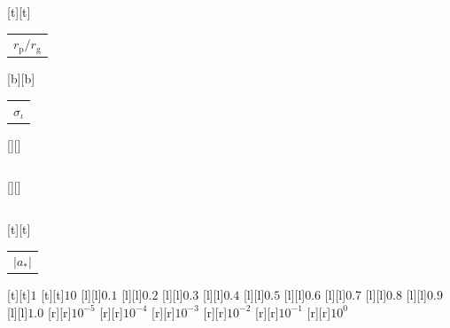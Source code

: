 %    
%
%
\begin{psfrags}%
\psfragscanon%
%
[t][t]{\color[rgb]{0,0,0}\setlength{\tabcolsep}{0pt}\begin{tabular}{c}{\Large$r_\mathrm{p}/r_\mathrm{g}$}\end{tabular}}%
[b][b]{\color[rgb]{0,0,0}\setlength{\tabcolsep}{0pt}\begin{tabular}{c}{\Large$\sigma_\iota$}\end{tabular}}%
[][]{\color[rgb]{0,0,0}\setlength{\tabcolsep}{0pt}\begin{tabular}{c} \end{tabular}}%
[][]{\color[rgb]{0,0,0}\setlength{\tabcolsep}{0pt}\begin{tabular}{c} \end{tabular}}%
[t][t]{\color[rgb]{0,0,0}\setlength{\tabcolsep}{0pt}\begin{tabular}{c}{\Large$\left|a_\ast\right|$}\end{tabular}}%
%
[t][t]{$1$}%
[t][t]{$10$}%
%
[l][l]{$0.1$}%
[l][l]{$0.2$}%
[l][l]{$0.3$}%
[l][l]{$0.4$}%
[l][l]{$0.5$}%
[l][l]{$0.6$}%
[l][l]{$0.7$}%
[l][l]{$0.8$}%
[l][l]{$0.9$}%
[l][l]{$1.0$}%
[r][r]{$10^{-5}$}%
[r][r]{$10^{-4}$}%
[r][r]{$10^{-3}$}%
[r][r]{$10^{-2}$}%
[r][r]{$10^{-1}$}%
[r][r]{$10^{0}$}%
%
%
\end{psfrags}%
%

